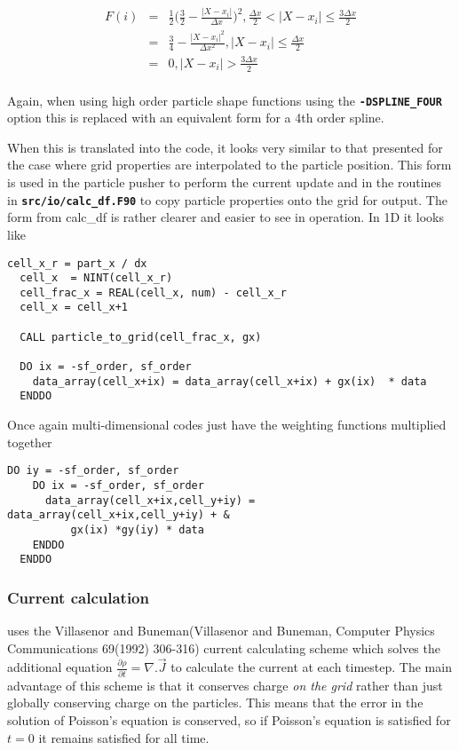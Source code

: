 \documentclass[12pt,a4paper]{article}
\newcommand{\simpleboxverbatim}{\begin{Verbatim}[obeytabs=true,frame=single,
  framerule=0.5mm,rulecolor=\color{warwickmid},formatcom=\color{black}]}
\newcommand{\inlinecode}[1]{{\color{warwickred} \bf\texttt{#1}}}
\newcommand{\EPOCH}{{\color{warwickdark}\fontfamily{phv}\selectfont{EPOCH}}}
\begin{document}
\begin{eqnarray*}
  F(i) &=& \frac{1}{2} \bigl(\frac{3}{2} - \frac{|X - x_i|}{\Delta x} \bigr)^2, \frac{\Delta x}{2} < |X-x_i| \le \frac{3 \Delta x}{2}\\
  &=& \frac{3}{4} - \frac{|X-x_i|^2}{\Delta x^2}, |X-x_i| \le \frac{\Delta x}{2}\\
  &=& 0, |X-x_i| > \frac{3 \Delta x}{2}\\
\end{eqnarray*}

Again, when using high order particle shape functions using the
\inlinecode{-DSPLINE\_FOUR} option this is replaced with an equivalent form for
a 4th order spline.

When this is translated into the code, it looks very similar to that presented
for the case where grid properties are interpolated to the particle
position. This form is used in the particle pusher to perform the current
update and in the routines in \inlinecode{src/io/calc\_df.F90} to copy particle
properties onto the grid for output. The form from calc\_df is rather clearer
and easier to see in operation. In 1D it looks like

\simpleboxverbatim
  cell_x_r = part_x / dx
  cell_x  = NINT(cell_x_r)
  cell_frac_x = REAL(cell_x, num) - cell_x_r
  cell_x = cell_x+1

  CALL particle_to_grid(cell_frac_x, gx)

  DO ix = -sf_order, sf_order
    data_array(cell_x+ix) = data_array(cell_x+ix) + gx(ix)  * data
  ENDDO
\end{Verbatim}

Once again multi-dimensional codes just have the weighting functions multiplied
together
\simpleboxverbatim
  DO iy = -sf_order, sf_order
    DO ix = -sf_order, sf_order
      data_array(cell_x+ix,cell_y+iy) = data_array(cell_x+ix,cell_y+iy) + &
          gx(ix) *gy(iy) * data
    ENDDO
  ENDDO
\end{Verbatim}

\subsubsection{Current calculation}
{\EPOCH} uses the Villasenor and Buneman(Villasenor and Buneman, Computer Physics
Communications 69(1992) 306-316) current calculating scheme which solves the
additional equation $\frac{\partial \rho}{\partial t} = \nabla . \vec{J}$ to
calculate the current at each timestep. The main advantage of this scheme is
that it conserves charge {\it on the grid} rather than just globally conserving
charge on the particles. This means that the error in the solution of Poisson's
equation is conserved, so if Poisson's equation is satisfied for $t=0$ it
remains satisfied for all time.\\
\end{document}

